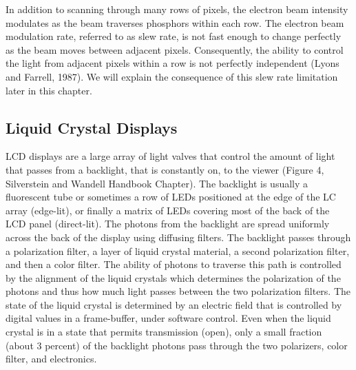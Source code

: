 \documentclass[
  letterpaper,
]{book}
\begin{document}
In addition to scanning through many rows of pixels, the electron beam
intensity modulates as the beam traverses phosphors within each row. The
electron beam modulation rate, referred to as slew rate, is not fast
enough to change perfectly as the beam moves between adjacent pixels.
Consequently, the ability to control the light from adjacent pixels
within a row is not perfectly independent (Lyons and Farrell, 1987). We
will explain the consequence of this slew rate limitation later in this
chapter.

\subsection{\texorpdfstring{\textbf{Liquid Crystal
Displays}}{Liquid Crystal Displays}}\label{liquid-crystal-displays}

LCD displays are a large array of light valves that control the amount
of light that passes from a backlight, that is constantly on, to the
viewer (Figure 4, Silverstein and Wandell Handbook Chapter). The
backlight is usually a fluorescent tube or sometimes a row of LEDs
positioned at the edge of the LC array (edge-lit), or finally a matrix
of LEDs covering most of the back of the LCD panel (direct-lit). The
photons from the backlight are spread uniformly across the back of the
display using diffusing filters. The backlight passes through a
polarization filter, a layer of liquid crystal material, a second
polarization filter, and then a color filter. The ability of photons to
traverse this path is controlled by the alignment of the liquid crystals
which determines the polarization of the photons and thus how much light
passes between the two polarization filters. The state of the liquid
crystal is determined by an electric field that is controlled by digital
values in a frame-buffer, under software control. Even when the liquid
crystal is in a state that permits transmission (open), only a small
fraction (about 3 percent) of the backlight photons pass through the two
polarizers, color filter, and electronics.
\end{document}
